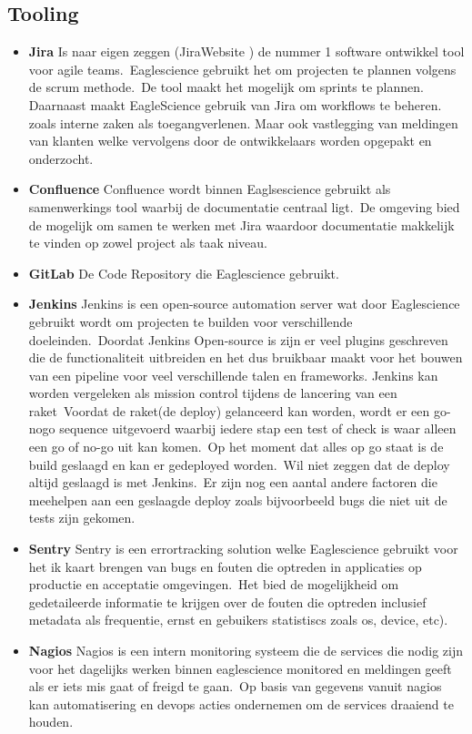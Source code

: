 \subsection{Tooling}
\begin{itemize}
\item \textbf{Jira} Is naar eigen zeggen (JiraWebsite ) de nummer 1 software ontwikkel tool voor agile teams.\ Eaglescience gebruikt het om projecten te plannen volgens de scrum methode.\ De tool maakt het mogelijk om sprints te plannen. Daarnaast maakt EagleScience gebruik van Jira om workflows te beheren. zoals interne zaken als toegangverlenen. Maar ook vastlegging van meldingen van klanten welke vervolgens door de ontwikkelaars worden opgepakt en onderzocht.
\item \textbf{Confluence}
Confluence wordt binnen Eaglsescience gebruikt als samenwerkings tool waarbij de documentatie centraal ligt.\ De omgeving bied de mogelijk om samen te werken met Jira waardoor documentatie makkelijk te vinden op zowel project als taak niveau.
\item \textbf{GitLab}
De Code Repository die Eaglescience gebruikt.
\item \textbf{Jenkins}
Jenkins is een open-source automation server wat door Eaglescience gebruikt wordt om projecten te builden voor verschillende doeleinden.\ Doordat Jenkins Open-source is zijn er veel plugins geschreven die de functionaliteit uitbreiden en het dus bruikbaar maakt voor het bouwen van een pipeline voor veel verschillende talen en frameworks.
Jenkins kan worden vergeleken als mission control tijdens de lancering van een raket\ Voordat de raket(de deploy) gelanceerd kan worden, wordt er een go-nogo sequence uitgevoerd waarbij iedere stap een test of check is waar alleen een go of no-go uit kan komen.\ Op het moment dat alles op go staat is de build geslaagd en kan er gedeployed worden.\ Wil niet zeggen dat de deploy altijd geslaagd is met Jenkins.\ Er zijn nog een aantal andere factoren die meehelpen aan een geslaagde deploy zoals bijvoorbeeld bugs die niet uit de tests zijn gekomen.
\item \textbf{Sentry}
Sentry is een errortracking solution welke Eaglescience gebruikt voor het ik kaart brengen van bugs en fouten die optreden in applicaties op productie en acceptatie omgevingen.\ Het bied de mogelijkheid om gedetaileerde informatie te krijgen over de fouten die optreden inclusief metadata als frequentie, ernst en gebuikers statistiscs zoals os, device, etc).
\item \textbf{Nagios}
Nagios is een intern monitoring systeem die de services die nodig zijn voor het dagelijks werken binnen eaglescience monitored en meldingen geeft als er iets mis gaat of freigd te gaan.\ Op basis van gegevens vanuit nagios kan automatisering en devops acties ondernemen om de services draaiend te houden.

\end{itemize}
